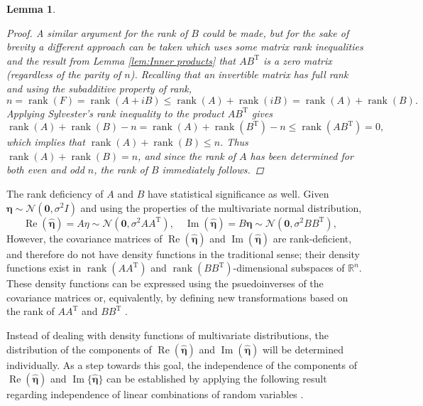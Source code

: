 \documentclass[12pt]{article}
\newcommand{\trans}{\mathrm{T}}	%
\DeclareMathOperator{\rank}{rank}	%
\newcommand{\noise}{\eta}	%
\newcommand{\noiseSD}{\sigma}	%
\newcommand{\noiseVec}{\bm{\noise}}	%
\renewcommand{\Re}{\operatorname{Re}}	%
\renewcommand{\Im}{\operatorname{Im}}	%
\newtheorem{lemma}{Lemma}[section]
\begin{document}
\begin{lemma}
\begin{proof}
A similar argument for the rank of $B$ could be made, but for the sake of brevity a different approach can be taken which uses some matrix rank inequalities and  the result from Lemma \ref{lem:Inner products} that $AB^\trans$ is a zero matrix (regardless of the parity of $n$). Recalling that an invertible matrix has full rank and using the subadditive property of rank,
\[n = \rank(F) = \rank(A + iB) \leq \rank(A) + \rank(iB) = \rank(A) + \rank(B).\] 
Applying Sylvester's rank inequality to the product $AB^\trans$ gives
\[\rank(A) + \rank(B) - n = \rank(A) + \rank(B^\trans) - n \leq \rank(AB^\trans) = 0,\]
which implies that $\rank(A) + \rank(B) \leq n$. Thus $\rank(A) + \rank(B) = n$, and since the rank of $A$ has been determined for both even and odd $n$, the rank of $B$ immediately follows. 
\end{proof}
\end{lemma} 

The rank deficiency of $A$ and $B$ have statistical significance as well.  Given $\noiseVec \sim \mathcal{N}(\bm{0},\noiseSD^2I)$ and using the properties of the multivariate normal distribution, 
\begin{equation}
\Re(\widehat{\noiseVec}) = A\noise \sim \mathcal{N}(\bm{0},\noiseSD^2 AA^\trans), \quad \Im(\widehat{\noiseVec}) = B\noiseVec \sim \mathcal{N}(\bm{0},\noiseSD^2 BB^\trans), \quad
\label{eq:Real and imaginary distributions}
\end{equation}
However, the covariance matrices of $\Re(\widehat{\noiseVec})$ and $\Im(\widehat{\noiseVec})$ are rank-deficient, and therefore do not have density functions in the traditional sense; their density functions exist in $\rank(AA^\trans)$ and $\rank(BB^\trans)$-dimensional subspaces of $\mathbb{R}^n$. These density functions can be expressed using the psuedoinverses of the covariance matrices or, equivalently, by defining new transformations based on the rank of $AA^\trans$ and $BB^\trans$ \cite[p.~527-528]{Rao1973}. \par 
Instead of dealing with density functions of multivariate distributions, the distribution of the components of $\Re(\widehat{\noiseVec})$ and $\Im(\widehat{\noiseVec})$ will be determined individually. As a step towards this goal, the independence of the components of $\Re(\widehat{\noiseVec})$ and $\Im\{\widehat{\noiseVec}\}$ can be established by applying the following result regarding independence of linear combinations of random variables \cite{LukacsKing}.
\end{document}
